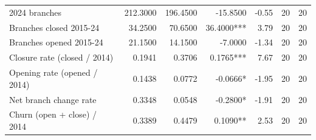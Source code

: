 \begin{tabular}{lrrrrrr}
2024 branches & 212.3000 & 196.4500 & -15.8500 & -0.55 & 20 & 20 \\
Branches closed 2015-24 & 34.2500 & 70.6500 & 36.4000*** & 3.79 & 20 & 20 \\
Branches opened 2015-24 & 21.1500 & 14.1500 & -7.0000 & -1.34 & 20 & 20 \\
Closure rate (closed / 2014) & 0.1941 & 0.3706 & 0.1765*** & 7.67 & 20 & 20 \\
Opening rate (opened / 2014) & 0.1438 & 0.0772 & -0.0666* & -1.95 & 20 & 20 \\
Net branch change rate & 0.3348 & 0.0548 & -0.2800* & -1.91 & 20 & 20 \\
Churn (open + close) / 2014 & 0.3389 & 0.4479 & 0.1090** & 2.53 & 20 & 20 \\
\bottomrule
\end{tabular}

